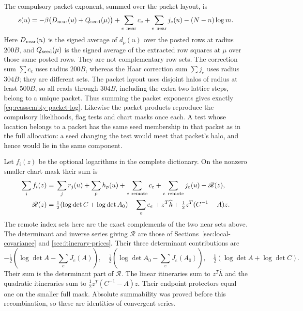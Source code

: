 The compulsory packet exponent, summed over the packet layout, is
\begin{equation}\label{eq:reassembly-packet-log}
 s(u)=-\beta\bigl(D_{\rm near}(u)+Q_{\rm seed}(\mu)\bigr)
       +\sum_{e\ {\rm near}}c_e+\sum_{e\ {\rm near}}j_e(u)
       -(N-n)\log m.
\end{equation}
Here $D_{\rm near}(u)$ is the signed average of $d_p(u)$ over the
posted rows at radius $200B$, and $Q_{\rm seed}(\mu)$ is the signed
average of the extracted row squares at $\mu$ over those same posted
rows. They are not complementary row sets. The correction sum $\sum c_e$ uses radius $200B$, whereas the Haar
correction sum $\sum j_e$ uses radius $304B$; they are different sets. The packet layout uses disjoint
halos of radius at least $500B$, so all reads through $304B$, including
the extra two lattice steps, belong to a unique packet. Thus summing
the packet exponents gives exactly \eqref{eq:reassembly-packet-log}.
Likewise the packet products reproduce the compulsory likelihoods,
flag tests and chart masks once each. A test whose location belongs to
a packet has the same seed membership in that packet as in the full
allocation: a seed changing the test would meet that packet's halo,
and hence would lie in the same component.

Let $f_i(z)$ be the optional logarithms in the complete dictionary.
On the nonzero smaller chart mask their sum is
\begin{align}
 \sum_i f_i(z)={}&\sum_j r_j(u)+\sum_p h_p(u)
                +\sum_{e\ {\rm remote}}c_e
                +\sum_{e\ {\rm remote}}j_e(u)+\mathscr R(z),
                                                        \label{eq:reassembly-logs}\\
 \mathscr R(z)={}&\tfrac12(\log\det C+\log\det A_0)
           -\sum_e c_e+z^T\widehat h
                       +\tfrac12z^T(C^{-1}-A)z.\nonumber
\end{align}
The remote index sets here are the exact complements of the two near
sets above. The determinant and inverse series giving $\mathscr R$
are those of Sections~\ref{sec:local-covariance} and
\ref{sec:itinerary-prices}. Their three determinant contributions are
\[
 -\tfrac12(\log\det A-\sum_eJ_e(A)),\quad
 \tfrac12(\log\det A_0-\sum_eJ_e(A_0)),\quad
 \tfrac12(\log\det A+\log\det C).
\]
Their sum is the determinant part of $\mathscr R$. The linear
itineraries sum to $z^T\widehat h$ and the quadratic itineraries sum
to $\frac12z^T(C^{-1}-A)z$. Their endpoint protectors equal one on
the smaller full mask. Absolute summability was proved before this
recombination, so these are identities of convergent series.

